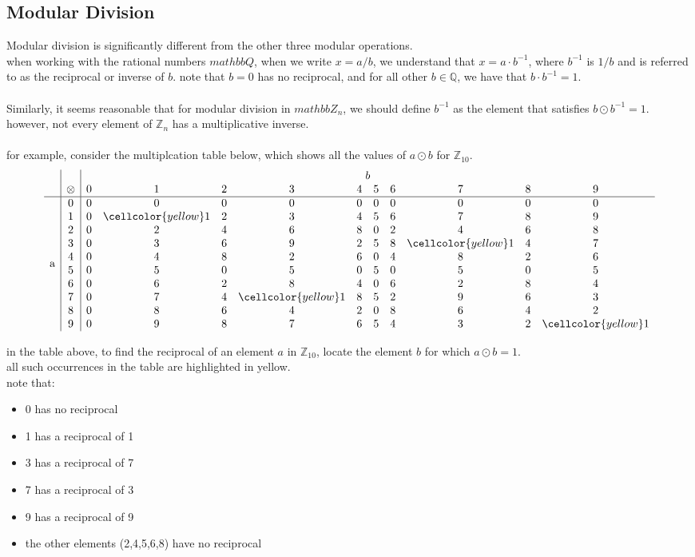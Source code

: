 \documentclass[12pt]{article}
\begin{document}
\subsection{Modular Division}
Modular division is significantly different from the other three modular operations.
\\ when working with the rational numbers $mathbb{Q}$, when we write $x=a/b$, we understand that
$x = a \cdot b^{-1}$, where $b^{-1}$ is $1/b$ and is referred to as the reciprocal or inverse of $b$. note that $b=0$ has no reciprocal, and for all other $b \in \mathbb{Q}$, we have that $b \cdot b^{-1} = 1$.
\\\\
Similarly, it seems reasonable that for modular division in $mathbb{Z}_n$, we should define 
$b^{-1}$ as the element that satisfies $b \odot b^{-1} = 1$. however, not every element of $\mathbb{Z}_n$ has a multiplicative inverse.
\\\\
for example, consider the multiplcation table below, which shows all the values of $a \odot b$ for $\mathbb{Z}_{10}$.
\[
\begin{array}{c|c|cccccccccc}
   &   & \multicolumn{10}{c}{b} \\
   & \otimes & 0 & 1 & 2 & 3 & 4 & 5 & 6 & 7 & 8 & 9 \\
\hline
\multirow{10}{*}{a}
 & 0 & 0 & 0 & 0 & 0 & 0 & 0 & 0 & 0 & 0 & 0 \\
 & 1 & 0 & \cellcolor{yellow}1 & 2 & 3 & 4 & 5 & 6 & 7 & 8 & 9 \\
 & 2 & 0 & 2 & 4 & 6 & 8 & 0 & 2 & 4 & 6 & 8 \\
 & 3 & 0 & 3 & 6 & 9 & 2 & 5 & 8 & \cellcolor{yellow}1 & 4 & 7 \\
 & 4 & 0 & 4 & 8 & 2 & 6 & 0 & 4 & 8 & 2 & 6 \\
 & 5 & 0 & 5 & 0 & 5 & 0 & 5 & 0 & 5 & 0 & 5 \\
 & 6 & 0 & 6 & 2 & 8 & 4 & 0 & 6 & 2 & 8 & 4 \\
 & 7 & 0 & 7 & 4 & \cellcolor{yellow}1 & 8 & 5 & 2 & 9 & 6 & 3 \\
 & 8 & 0 & 8 & 6 & 4 & 2 & 0 & 8 & 6 & 4 & 2 \\
 & 9 & 0 & 9 & 8 & 7 & 6 & 5 & 4 & 3 & 2 & \cellcolor{yellow}1 \\
\end{array}
\]

in the table above, to find the reciprocal of an element $a$ in $\mathbb{Z}_{10}$, locate the element $b$ for which $a \odot b =1$.
\\ all such occurrences in the table are highlighted in yellow.
\\note that:
\begin{itemize}
    \item 0 has no reciprocal
    \item 1 has a reciprocal of 1
    \item 3 has a reciprocal of 7
    \item 7 has a reciprocal of 3
    \item 9 has a reciprocal of 9
    \item the other elements (2,4,5,6,8) have no reciprocal
\end{itemize}
\end{document}
